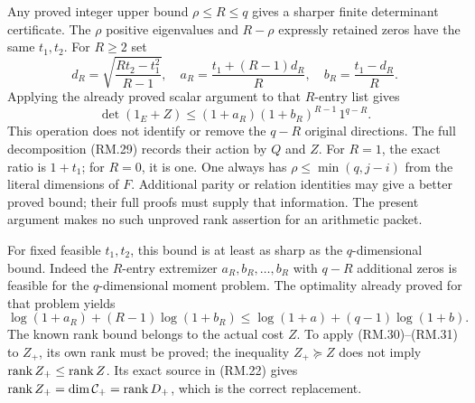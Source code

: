 \documentclass[11pt]{article}
\begin{document}
Any proved integer upper bound $\rho\le R\le q$ gives a sharper
finite determinant certificate. The $\rho$ positive eigenvalues and
$R-\rho$ expressly retained zeros have the same $t_1,t_2$. For $R\ge2$ set
\begin{equation}
 d_R=\sqrt{\frac{Rt_2-t_1^2}{R-1}},\quad
 a_R=\frac{t_1+(R-1)d_R}{R},\quad
 b_R=\frac{t_1-d_R}{R}.\tag{RM.30}
\end{equation}
Applying the already proved scalar argument to that $R$-entry list gives
\begin{equation}
 \det(1_E+Z)\le(1+a_R)(1+b_R)^{R-1}\,1^{q-R}.\tag{RM.31}
\end{equation}
This operation does not identify or remove the $q-R$ original directions.
The full decomposition (RM.29) records their action by $Q$ and $Z$.
For $R=1$, the exact ratio is $1+t_1$; for $R=0$, it is one.
One always has $\rho\le\min(q,j-i)$ from the literal dimensions of $F$.
Additional parity or relation identities may give a better proved bound;
their full proofs must supply that information. The present argument makes
no such unproved rank assertion for an arithmetic packet.

For fixed feasible $t_1,t_2$, this bound is at least as sharp as the
$q$-dimensional bound. Indeed the $R$-entry extremizer
$a_R,b_R,\ldots,b_R$ with $q-R$ additional zeros is feasible for the
$q$-dimensional moment problem. The optimality already proved for that
problem yields
\[
 \log(1+a_R)+(R-1)\log(1+b_R)
 \le\log(1+a)+(q-1)\log(1+b).
\]
The known rank bound belongs to the actual cost $Z$. To apply (RM.30)--(RM.31)
to $Z_+$, its own rank must be proved; the inequality $Z_+\succeq Z$
does not imply $\operatorname{rank} Z_+\le\operatorname{rank} Z$. Its exact source in (RM.22) gives
$\operatorname{rank} Z_+=\dim\mathcal C_+=\operatorname{rank} D_+$, which is the correct replacement.
\end{document}
